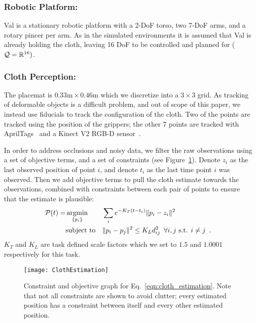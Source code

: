 \subsubsection{Robotic Platform:}
Val is a stationary robotic platform with a 2-DoF torso, two 7-DoF arms, and a rotary pincer per arm. As in the simulated environments it is assumed that Val is already holding the cloth, leaving 16 DoF to be controlled and planned for ($\mathcal{Q} = \mathbb{R}^{16})$.


\subsubsection{Cloth Perception:}
\label{sec:cloth_perception}

The placemat is $0.33\text{m} \times 0.46\text{m}$ which we discretize into a $3 \times 3$ grid. As tracking of deformable objects is a difficult problem, and out of scope of this paper, we instead use fiducials to track the configuration of the cloth. Two of the points are tracked using the position of the grippers; the other 7 points are tracked with AprilTags~\cite{olson2011tags} and a Kinect V2 RGB-D sensor~\cite{iai_kinect2}.

In order to address occlusions and noisy data, we filter the raw observations using a set of objective terms, and a set of constraints (see Figure~\ref{fig:cloth_estimation}). Denote $z_i$ as the last observed position of point $i$, and denote $t_i$ as the last time point $i$ was observed. Then we add objective terms to pull the cloth estimate towards the observations, combined with constraints between each pair of points to ensure that the estimate is plausible:
\begin{equation}
\begin{aligned}
    \mathcal{P}(t) = &\operatorname*{argmin}_{\{ p_i \}} 
            & & \sum_i e^{-K_T(t - t_i)} \| p_i - z_i \|^2 \\
            & \text{subject to}
            & & \| p_i - p_j \|^2 \leq K_L d_{ij}^2 \enspace \forall i, j \text{ s.t. } i \neq j \enspace .
\end{aligned}
\label{eqn:cloth_estimation}
\end{equation}
$K_T$ and $K_L$ are task defined scale factors which we set to $1.5$ and $1.0001$ respectively for this task.

\begin{figure}[h]
    \centering
    \texttt{[image: ClothEstimation]}
    \caption{Constraint and objective graph for Eq.~\eqref{eqn:cloth_estimation}. Note that not all constraints are shown to avoid clutter; every estimated position has a constraint between itself and every other estimated position.}
    \label{fig:cloth_estimation}
\end{figure}


